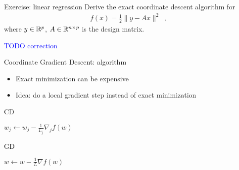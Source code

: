 \begin{frame}{Exercise: linear regression}
    Derive the exact coordinate descent algorithm for
    \begin{align*}
        f(x)= \frac{1}{2} \|y - A x\|^2
        \enspace ,
    \end{align*}
    where $y \in \mathbb{R}^p$, $A \in \mathbb{R}^{n \times p}$ is the design matrix.

    \medskip
    \pause

    \textcolor{blue}{TODO correction}

\end{frame}

\begin{frame}{Coordinate Gradient Descent: algorithm}
    \begin{itemize}
        \item Exact minimization can be expensive
        \item \alert{Idea:} do a \alert{local gradient step} instead of exact minimization
    \end{itemize}
\begin{minipage}{0.49 \textwidth}
    \begin{algorithm}[H]
        \caption{CD}
                {
                    {

                    $w_j \leftarrow w_j - \frac{1}{L_j} \nabla_j f (w)$
                    }
                }
    \end{algorithm}
\end{minipage}
%
\begin{minipage}{0.49 \textwidth}
    \begin{algorithm}[H]
        \caption{GD}
                {

                    $w \leftarrow w - \frac{1}{L} \nabla f (w)$
                }
    \end{algorithm}
\end{minipage}
\end{frame}

